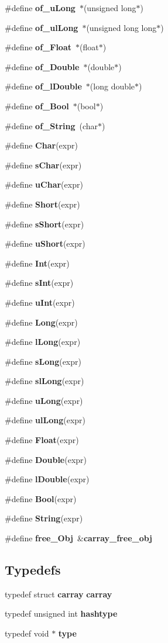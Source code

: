 \begin{DoxyCompactItemize}
\#define {\bfseries of\+\_\+u\+Long}~$\ast$(unsigned long$\ast$)
\item 
\#define {\bfseries of\+\_\+ul\+Long}~$\ast$(unsigned long long$\ast$)
\item 
\#define {\bfseries of\+\_\+\+Float}~$\ast$(float$\ast$)
\item 
\#define {\bfseries of\+\_\+\+Double}~$\ast$(double$\ast$)
\item 
\#define {\bfseries of\+\_\+l\+Double}~$\ast$(long double$\ast$)
\item 
\#define {\bfseries of\+\_\+\+Bool}~$\ast$(bool$\ast$)
\item 
\#define {\bfseries of\+\_\+\+String}~(char$\ast$)
\item 
\#define {\bfseries Char}(expr)
\item 
\#define {\bfseries s\+Char}(expr)
\item 
\#define {\bfseries u\+Char}(expr)
\item 
\#define {\bfseries Short}(expr)
\item 
\#define {\bfseries s\+Short}(expr)
\item 
\#define {\bfseries u\+Short}(expr)
\item 
\#define {\bfseries Int}(expr)
\item 
\#define {\bfseries s\+Int}(expr)
\item 
\#define {\bfseries u\+Int}(expr)
\item 
\#define {\bfseries Long}(expr)
\item 
\#define {\bfseries l\+Long}(expr)
\item 
\#define {\bfseries s\+Long}(expr)
\item 
\#define {\bfseries sl\+Long}(expr)
\item 
\#define {\bfseries u\+Long}(expr)
\item 
\#define {\bfseries ul\+Long}(expr)
\item 
\#define {\bfseries Float}(expr)
\item 
\#define {\bfseries Double}(expr)
\item 
\#define {\bfseries l\+Double}(expr)
\item 
\#define {\bfseries Bool}(expr)
\item 
\#define {\bfseries String}(expr)
\item 
\#define {\bfseries free\+\_\+\+Obj}~\&{\bf carray\+\_\+free\+\_\+obj}
\end{DoxyCompactItemize}
\subsection*{Typedefs}
\begin{DoxyCompactItemize}
\item 
typedef struct {\bf carray} {\bf carray}
\item 
typedef unsigned int {\bfseries hashtype}
\item 
typedef void $\ast$ {\bfseries type}
\end{DoxyCompactItemize}
